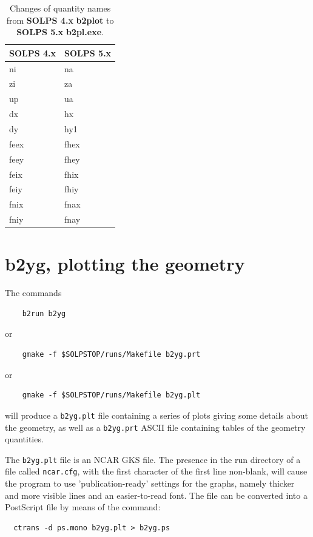 \documentclass[a4paper,10pt]{report}
\newcommand\SOLPSfour{{\bf SOLPS 4.x} }
\newcommand\SOLPSfive{{\bf SOLPS 5.x} }
\newcommand{\btwoplot}{{\bf b2plot} }
\begin{document}
\begin{table}[hbtp]
  \leavevmode
  \begin{center}
    \begin{tabular}{|l|l|}
    \hline
    \SOLPSfour  & \SOLPSfive  \\ \hline
    ni          & na          \\
    zi          & za          \\
    up          & ua          \\
    dx          & hx          \\
    dy          & hy1         \\
    feex        & fhex        \\
    feey        & fhey        \\
    feix        & fhix        \\
    feiy        & fhiy        \\
    fnix        & fnax        \\
    fniy        & fnay        \\ \hline
    \end{tabular}
    \caption{Changes of quantity names from \SOLPSfour \btwoplot to \SOLPSfive {\bf b2pl.exe}.}
    \label{tab:changedplotquantities}
  \end{center}
\end{table}

\newpage
\section{b2yg, plotting the geometry}
\label{sec:b2yg}

The commands
\begin{verbatim}
    b2run b2yg
\end{verbatim}
or
\begin{verbatim}
    gmake -f $SOLPSTOP/runs/Makefile b2yg.prt
\end{verbatim}
or
\begin{verbatim}
    gmake -f $SOLPSTOP/runs/Makefile b2yg.plt
\end{verbatim}
will produce a {\tt b2yg.plt} file containing a series of plots giving
some details about the geometry, as well as a {\tt b2yg.prt} ASCII file
containing tables of the geometry quantities.

The {\tt b2yg.plt} file is an NCAR GKS file. The presence in the run directory
of a file called {\tt ncar.cfg}, with the first character of the first line non-blank,
will cause the program to use 'publication-ready' settings for the graphs, namely
thicker and more visible lines and an easier-to-read font.
The file can be converted into a PostScript file by means of the command:
\begin{verbatim}
  ctrans -d ps.mono b2yg.plt > b2yg.ps
\end{verbatim}
\end{document}
